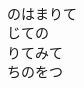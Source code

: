\documentclass[10pt,b5j]{tarticle} %
\begin{document}
\begin{enumerate}
\begin{minipage}[c]{\blocksize}
    \end{minipage}
    \begin{minipage}[c]{\blocksize}
        
        \vspace{\linespace}
        \item~\\
        のはまりて\\
        じての\\
        りてみて\\
        ちのをつ
    
    \end{minipage}
\end{enumerate} %
\end{document}
